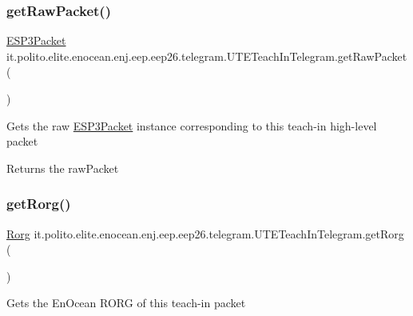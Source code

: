 \subsubsection{\texorpdfstring{get\+Raw\+Packet()}{getRawPacket()}}
{\footnotesize\ttfamily \hyperlink{classit_1_1polito_1_1elite_1_1enocean_1_1protocol_1_1serial_1_1v3_1_1network_1_1packet_1_1_e_s_p3_packet}{E\+S\+P3\+Packet} it.\+polito.\+elite.\+enocean.\+enj.\+eep.\+eep26.\+telegram.\+U\+T\+E\+Teach\+In\+Telegram.\+get\+Raw\+Packet (\begin{DoxyParamCaption}{ }\end{DoxyParamCaption})}

Gets the raw \hyperlink{}{E\+S\+P3\+Packet} instance corresponding to this teach-\/in high-\/level packet

\begin{DoxyReturn}{Returns}
the raw\+Packet 
\end{DoxyReturn}
\hypertarget{classit_1_1polito_1_1elite_1_1enocean_1_1enj_1_1eep_1_1eep26_1_1telegram_1_1_u_t_e_teach_in_telegram_aadc99d57e52f78c2656f3a510c61a265}{}\label{classit_1_1polito_1_1elite_1_1enocean_1_1enj_1_1eep_1_1eep26_1_1telegram_1_1_u_t_e_teach_in_telegram_aadc99d57e52f78c2656f3a510c61a265} 
\subsubsection{\texorpdfstring{get\+Rorg()}{getRorg()}}
{\footnotesize\ttfamily \hyperlink{classit_1_1polito_1_1elite_1_1enocean_1_1enj_1_1eep_1_1_rorg}{Rorg} it.\+polito.\+elite.\+enocean.\+enj.\+eep.\+eep26.\+telegram.\+U\+T\+E\+Teach\+In\+Telegram.\+get\+Rorg (\begin{DoxyParamCaption}{ }\end{DoxyParamCaption})}

Gets the En\+Ocean R\+O\+RG of this teach-\/in packet

